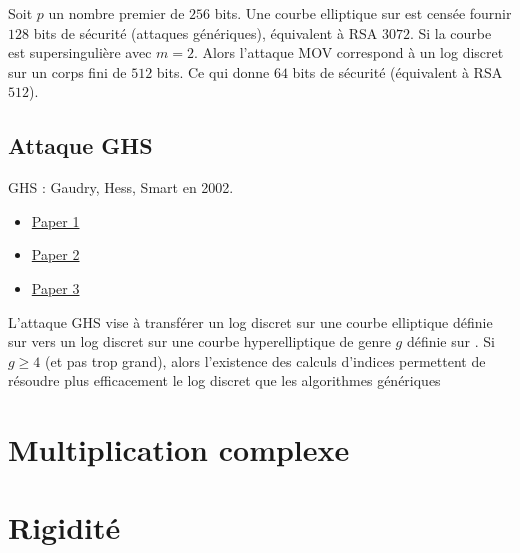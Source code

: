 \begin{ex}
Soit $p$ un nombre premier de $256$ bits.
Une courbe elliptique sur  est censée fournir $128$ bits de sécurité (attaques génériques), équivalent à RSA $3072$.
Si la courbe est supersingulière avec $m = 2$. Alors l'attaque MOV correspond à un log discret sur un corps fini de $512$ bits. Ce qui donne $64$ bits de sécurité (équivalent à RSA $512$).
\end{ex}


\subsection{Attaque GHS}
GHS : Gaudry, Hess, Smart en 2002.
\begin{itemize}
    \item \href{http://citeseerx.ist.psu.edu/viewdoc/download;jsessionid=0FFAE41880B0197BDD30BF31C899B204?doi=10.1.1.25.7356&rep=rep1&type=pdf}{Paper 1}
    \item \href{http://citeseerx.ist.psu.edu/viewdoc/download?doi=10.1.1.38.1805&rep=rep1&type=pdf}{Paper 2}
    \item \href{https://eprint.iacr.org/2001/054}{Paper 3}
\end{itemize}

L'attaque GHS vise à transférer un log discret sur une courbe elliptique définie sur  vers un log discret sur une courbe hyperelliptique de genre $g$ définie sur . Si $g \geq 4$ (et pas trop grand), alors l'existence des calculs d'indices permettent de résoudre plus efficacement le log discret que les algorithmes génériques


\section{Multiplication complexe}



\section{Rigidité}